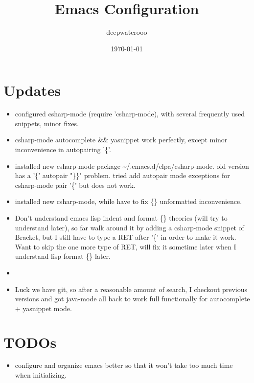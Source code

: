 \documentclass[9pt,b5paper]{article}
\author{deepwaterooo}
\date{\today}
\title{Emacs Configuration}
\begin{document}
\maketitle
\tableofcontents


\section{Updates}
\label{sec-1}
\begin{itemize}
\item configured csharp-mode (require 'csharp-mode), with several frequently used snippets, minor fixes.
\item csharp-mode autocomplete \&\& yasnippet work perfectly, except minor inconvenience in autopairing '\{'.
\item installed new csharp-mode package \textasciitilde{}/.emacs.d/elpa/csharp-mode. old version has a '\{' autopair "\}\}" problem. tried add autopair mode exceptions for csharp-mode pair '\{' but does not work.
\item installed new csharp-mode, while have to fix \{\} unformatted inconvenience.
\item Don't understand emacs lisp indent and format \{\} theories (will try to understand later), so far walk around it by adding a csharp-mode snippet of Bracket, but I still have to type a RET after '\{' in order to make it work. Want to skip the one more type of RET, will fix it sometime later when I understand lisp format \{\} later.
\item
\item Luck we have git, so after a reasonable amount of search, I checkout previous versions and got java-mode all back to work full functionally for autocomplete + yasnippet mode.
\end{itemize}

\section{TODOs}
\label{sec-2}
\begin{itemize}
\item configure and organize emacs better so that it won't take too much time when initializing.
\end{itemize}
\end{document}
